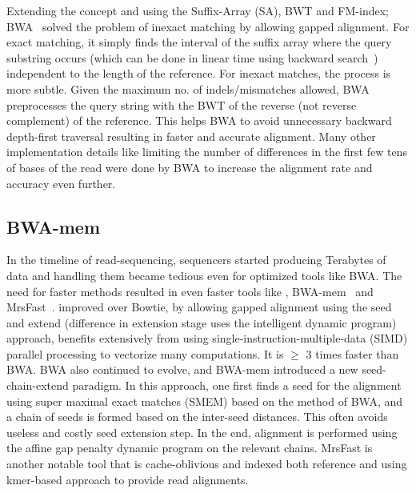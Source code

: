 Extending the concept and using the Suffix-Array (SA), BWT and FM-index; BWA~\citep{bwa} solved the problem of inexact matching by allowing gapped alignment. For exact matching, it simply finds the interval of the suffix array where the query substring occurs (which can be done in linear time using backward search~\citep{ferragina2000opportunistic}) independent to the length of the reference. For inexact matches, the process is more subtle. Given the maximum no. of indels/mismatches allowed, BWA preprocesses the query string with the BWT of the reverse (not reverse complement) of the reference. This helps BWA to avoid unnecessary backward depth-first traversal resulting in faster and accurate alignment. Many other implementation details like limiting the number of differences in the first few tens of bases of the read were done by BWA to increase the alignment rate and accuracy even further.


\subsection{BWA-mem~\citep{bwamem}} \label{bwa-mem}

In the timeline of read-sequencing, sequencers started producing Terabytes of data and handling them became tedious even for optimized tools like BWA. The need for faster methods resulted in even faster tools like \bt, BWA-mem~\citep{bwamem} and MrsFast~\citep{mrsfast}. \bt improved over Bowtie, by allowing gapped alignment using the seed and extend (difference in extension stage uses the intelligent dynamic program) approach, \bt benefits extensively from using single-instruction-multiple-data (SIMD) parallel processing to vectorize many computations. It is $\geq$ 3 times faster than BWA. BWA also continued to evolve, and BWA-mem introduced a new seed-chain-extend paradigm. In this approach, one first finds a seed for the alignment using super maximal exact matches (SMEM) based on the method of BWA, and a chain of seeds is formed based on the inter-seed distances. This often avoids useless and costly seed extension step. In the end, alignment is performed using the affine gap penalty dynamic program on the relevant chains. MrsFast is another notable tool that is cache-oblivious and indexed both reference and \reads using kmer-based approach to provide read alignments.

\begin{figure*}
 \centering
 \texttt{[image: rapmap/\{Avi.RPE.fig.5]}.png}
  \caption{From Top to bottom~\citep{altfigure}. : DNA, RNA and mRNA.}
  \label{fig:alt-splicing}
\end{figure*}

